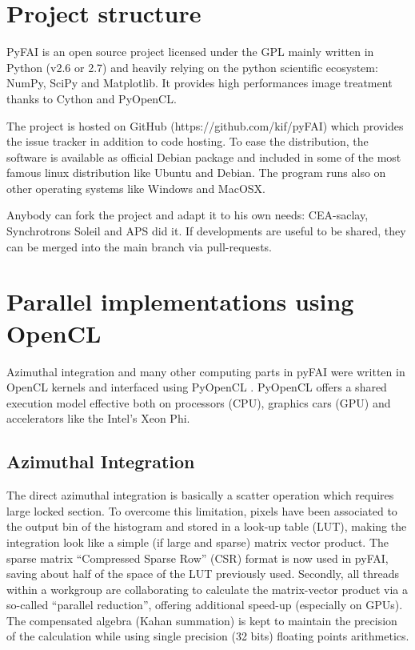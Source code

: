 \documentclass[preprint]{iucr}
\begin{document}


\appendix
\section{Project structure}
PyFAI is an open source project licensed under the GPL mainly written in Python (v2.6 or 2.7)
and heavily relying on the python scientific ecosystem: NumPy, SciPy and Matplotlib.
It provides high performances image treatment thanks to Cython and PyOpenCL.

The project is hosted on GitHub (https://github.com/kif/pyFAI) which provides
the issue tracker in addition to code hosting.
To ease the distribution, the
software is available as official Debian package and included in some of the
most famous linux distribution like Ubuntu and Debian.
The program runs also on other operating systems like Windows and MacOSX.

Anybody can fork the project and adapt it to his own needs: CEA-saclay,
Synchrotrons Soleil and APS did it. If developments are useful to be shared,
they can be merged into the main branch via pull-requests.

\section{Parallel implementations using OpenCL}
Azimuthal integration and many other computing parts in pyFAI were written in
OpenCL kernels and interfaced using PyOpenCL \cite{pyopencl}. PyOpenCL offers a
shared execution model effective both on processors (CPU), graphics cars (GPU)
and accelerators like the Intel's Xeon Phi.

\subsection{Azimuthal Integration}
The direct azimuthal integration is basically a scatter operation which
requires large locked section.
To overcome this limitation, pixels have been
associated to the output bin of the histogram and stored in a look-up
table (LUT), making the integration look like a simple (if large and sparse)
matrix vector product.
The sparse matrix ``Compressed Sparse Row'' (CSR) format is now used in pyFAI,
saving about half of the space of the LUT previously used.
Secondly, all threads within a workgroup are collaborating to calculate the
matrix-vector product via a so-called ``parallel reduction'', offering
additional speed-up (especially on GPUs).
The compensated algebra (Kahan summation) is kept to maintain the precision
of the calculation while using single precision (32 bits) floating points
arithmetics.
\end{document}
